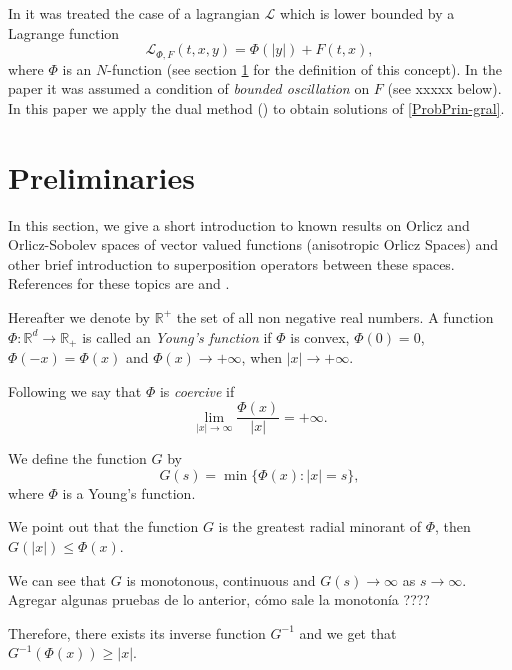 \documentclass[twoside]{article}
\theoremstyle{remark}
\renewcommand{\leq}{\leqslant}
\renewcommand{\geq}{\geqslant}
\begin{document}
In \cite{ABGMS2015} it was treated  the case of a lagrangian $\mathcal{L}$ which is lower bounded by a Lagrange function
\begin{equation}\label{eq:lagrange_phi}
\mathcal{L}_{\Phi,F}(t,x,y)=\Phi(|y|)+F(t,x),
\end{equation}
where  $\Phi$ is an $N$-function (see section \ref{preliminares} for the definition of this concept).  
In the paper \cite{ABGMS2015} it was assumed  a condition of \emph{bounded oscillation} on $F$  (see xxxxx below). 
In this paper  we apply the dual method (\cite[Ch. 3]{mawhin2010critical}) to obtain solutions of \eqref{ProbPrin-gral}.



\section{Preliminaries}\label{preliminares}

In this section, we give a short introduction to known results on Orlicz and Orlicz-Sobolev spaces of vector valued functions (anisotropic Orlicz Spaces) and other brief introduction to superposition operators between these spaces. References for  these topics are \cite{Orliczvectorial2005,Skaff1969, Desch2001} and
\cite{zbMATH04038592,zbMATH04009182,zbMATH03983966,zbMATH03942215}. 

Hereafter we denote  by $\mathbb{R}^+$  the set of all non negative real numbers. A function $\Phi:\mathbb{R}^d\to \mathbb{R}_+ $ is called an \emph{Young's function} if $\Phi$ is convex, $\Phi(0)=0$, $\Phi(-x)=\Phi(x)$ and $\Phi(x)\to +\infty$, when $|x|\to+\infty$.

Following \cite{Orliczvectorial2005} we say that $\Phi$ is \emph{coercive} if
\[\lim_{|x|\to\infty}\frac{\Phi(x)}{|x|}=+\infty.\]

We define the function $G$ by
\begin{equation}\label{eq:inversa-gral}
G(s)=\min\{\Phi(x):|x|=s\},
\end{equation}
where $\Phi$ is a Young's function. 

We point out that the function $G$ is the greatest radial minorant of $\Phi$, then $G(|x|)\leq \Phi (x)$. 

We can see that $G$ is monotonous, continuous and $G(s) \to \infty$ as $s \to \infty$.
{\color{red}Agregar algunas pruebas de lo anterior, c\'omo sale la monoton\'ia ????}

Therefore, there exists its inverse function $G^{-1}$ and
 we get that $G^{-1}(\Phi(x))\geq |x|$.
\end{document}
